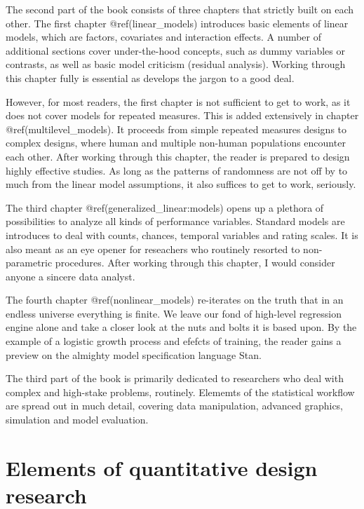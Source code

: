\documentclass[]{svmono}
\begin{document}
The second part of the book consists of three chapters that strictly
built on each other. The first chapter @ref(linear\_models) introduces
basic elements of linear models, which are factors, covariates and
interaction effects. A number of additional sections cover
under-the-hood concepts, such as dummy variables or contrasts, as well
as basic model criticism (residual analysis). Working through this
chapter fully is essential as develops the jargon to a good deal.

However, for most readers, the first chapter is not sufficient to get to
work, as it does not cover models for repeated measures. This is added
extensively in chapter @ref(multilevel\_models). It proceeds from simple
repeated measures designs to complex designs, where human and multiple
non-human populations encounter each other. After working through this
chapter, the reader is prepared to design highly effective studies. As
long as the patterns of randomness are not off by to much from the
linear model assumptions, it also suffices to get to work, seriously.

The third chapter @ref(generalized\_linear:models) opens up a plethora
of possibilities to analyze all kinds of performance variables. Standard
models are introduces to deal with counts, chances, temporal variables
and rating scales. It is also meant as an eye opener for reseachers who
routinely resorted to non-parametric procedures. After working through
this chapter, I would consider anyone a sincere data analyst.

The fourth chapter @ref(nonlinear\_models) re-iterates on the truth that
in an endless universe everything is finite. We leave our fond of
high-level regression engine alone and take a closer look at the nuts
and bolts it is based upon. By the example of a logistic growth process
and efefcts of training, the reader gains a preview on the almighty
model specification language Stan.

The third part of the book is primarily dedicated to researchers who
deal with complex and high-stake problems, routinely. Elememts of the
statistical workflow are spread out in much detail, covering data
manipulation, advanced graphics, simulation and model evaluation.

\chapter{Elements of quantitative design
research}\label{design_research}
\end{document}
